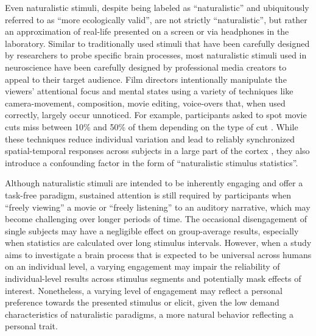 %
Even naturalistic stimuli, despite being labeled as ``naturalistic''
and ubiquitously referred to as ``more ecologically valid'', are not strictly
``naturalistic'', but rather an approximation of real-life presented on a screen
or via headphones in the laboratory.
Similar to traditionally used stimuli that have been carefully designed by
researchers to probe specific brain processes, most naturalistic stimuli used in
neuroscience have been carefully designed by professional media creators to
appeal to their target audience.
%
Film directors intentionally manipulate the viewers' attentional focus and
mental states using a variety of techniques like camera-movement, composition,
movie editing, voice-overs \citep{brown2012cinematography,
dancyger2011film-technique, katz1991film, mercado2011filmmakers} that, when used
correctly, largely occur unnoticed.
%
For example, participants asked to spot movie cuts miss between 10\% and 50\% of
them depending on the type of cut \citep{smith2008edit}.
%
While these techniques reduce individual variation and lead to reliably
synchronized spatial-temporal responses across subjects in a large part of the
cortex \citep{hasson2008neurocinematics}, they also introduce a confounding
factor in the form of ``naturalistic stimulus statistics''.

%
Although naturalistic stimuli are intended to be inherently engaging and offer a
task-free paradigm, sustained attention is still required by participants when
``freely viewing'' a movie or ``freely listening'' to an auditory narrative,
which may become challenging over longer periods of time.
%
The occasional disengagement of single subjects may have a negligible effect on
group-average results, especially when statistics are calculated over long
stimulus intervals.
%
However, when a study aims to investigate a brain process that is expected to be
universal across humans on an individual level, a varying engagement may impair
the reliability of individual-level results across stimulus segments and
potentially mask effects of interest.
%
Nonetheless, a varying level of engagement may reflect a personal preference
towards the presented stimulus or elicit, given the low demand characteristics
\citep[cf.][]{orne1962social} of naturalistic paradigms, a more natural behavior
reflecting a personal trait.






